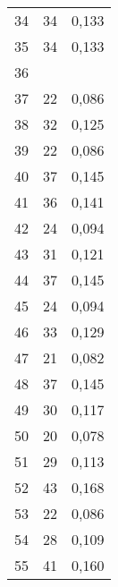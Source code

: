 \begin{table}[htbp]
\begin{tabular}{SSS}
    34    & 34    & 0,133 \\
    35    & 34    & 0,133 \\
    36    &       &  \\
    37    & 22    & 0,086 \\
    38    & 32    & 0,125 \\
    39    & 22    & 0,086 \\
    40    & 37    & 0,145 \\
    41    & 36    & 0,141 \\
    42    & 24    & 0,094 \\
    43    & 31    & 0,121 \\
    44    & 37    & 0,145 \\
    45    & 24    & 0,094 \\
    46    & 33    & 0,129 \\
    47    & 21    & 0,082 \\
    48    & 37    & 0,145 \\
    49    & 30    & 0,117 \\
    50    & 20    & 0,078 \\
    51    & 29    & 0,113 \\
    52    & 43    & 0,168 \\
    53    & 22    & 0,086 \\
    54    & 28    & 0,109 \\
    55    & 41    & 0,160 \\
    \bottomrule
    \end{tabular}%
  \label{tab:addlabel}%
\end{table}%
